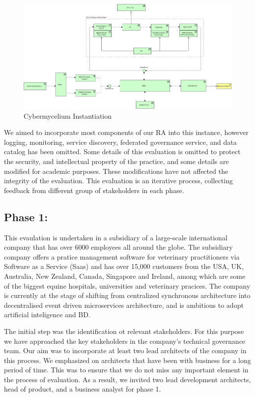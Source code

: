 \documentclass{bmcart}
\begin{document}
\begin{figure}
    \includegraphics[width=23cm]{Media/concrete-mycelium.jpg}
    \caption{Cybermycelium Instantiation}
    \label{fig:ConcreteCyberMycelium}
\end{figure}

We aimed to incorporate most components of our RA into this instance, however logging, monitoring, service discovery, federated governance service, and data catalog has been omitted. Some details of this evaluation is omitted to protect the security, and intellectual property of the practice, and some details are modified for academic purposes. These modifications have not affected the integrity of the evaluation. This evaluation is an iterative process, collecting feedback from different group of stakeholders in each phase. 

\subsection{Phase 1:}

This evaulation is undertaken in a subsidiary of a large-scale international company that has over 6000 employees all around the globe. The subsidiary company offers a pratice management software for veterinary practitioners via Software as a Service (Saas) and has over 15,000 customers from the USA, UK, Australia, New Zealand, Canada, Singapore and Ireland, among which are some of the biggest equine hospitals, universities and veterinary pracices. The company is currently at the stage of shifting from centralized synchronous architecture into decentralised event driven microservices architecture, and is ambitious to adopt artificial inteligence and BD.

The initial step was the identification ot relevant stakeholders. For this purpose we have approached the key stakeholders in the company's technical governance team. Our aim was to incorporate at least two lead architects of the company in this process. We emphasized on architects that have been with business for a long period of time. This was to ensure that we do not miss any important element in the process of evaluation. As a result, we invited two lead development architects, head of product, and a business analyst for phase 1.
\end{document}
